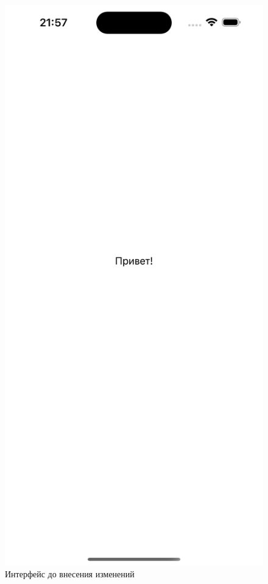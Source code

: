 \begin{figure}[!htb]
	\centering
	\includegraphics[scale=0.1]{img/example-before.png}
	\caption{Интерфейс до внесения изменений}
	\label{fig:example-before}
\end{figure}

